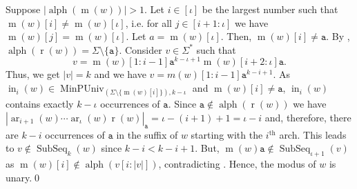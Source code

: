 \documentclass[10pt,a4paper]{amsart}
\makeatletter
\def\ta{\mathtt{a}}
\def\r{\operatorname{r}}
\def\m{\operatorname{m}}
\DeclareMathOperator{\ar}{ar}
\DeclareMathOperator{\alphabet}{alph}
\DeclareMathOperator\ScatFact{SubSeq}
\DeclareMathOperator{\MinPerfUniv}{MinPUniv}
\DeclareMathOperator{\inner}{in}
\def\nth#1{#1$^{\text{th}}$}
\theoremstyle{plain}
\theoremstyle{definition}
\renewenvironment{proof}[1][\proofname]{\par
  \pushQED{}%
  \normalfont \topsep6\p@\@plus6\p@\relax
  \trivlist
  \item[\hskip\labelsep\itshape #1\@addpunct{.}]\ignorespaces
}{%
  \popQED\endtrivlist\@endpefalse
}
\makeatother
\begin{document}
\begin{proof}
	Suppose $\vert \alphabet(\m(w))\vert  > 1$.
	Let $i\in[\iota]$ be the largest number such that $\m(w)[i] \neq \m(w)[\iota]$, i.e.
	for all $j\in[i+1:\iota]$ we have $\m(w)[j] = \m(w)[\iota]$.
	Let $a=\m(w)[\iota]$. Then, $\m(w)[i] \neq \ta$.
	By , $\alphabet(\r(w)) = \Sigma\setminus\{\ta\}$.
	Consider $v\in\Sigma^*$ such that 
	\[
	v = \m(w)[1:i-1]\ta^{k-\iota+1}\m(w)[i+2:\iota]\ta.
	\]
	Thus, we get $\vert v\vert  = k$ and we have 
	$v = m(w)[1:i-1]\ta^{k-i+1}$.
	As $\inner_i(w) \in \MinPerfUniv_{(\Sigma\setminus\{\m(w)[i]\}),k-\iota}$ and $\m(w)[i]\neq \ta$, $\inner_i(w)$ contains exactly 
	$k-\iota$ occurrences of $\ta$. 
	Since $\ta\notin\alphabet(\r(w))$ we have $|\ar_{i+1}(w)\cdots\ar_{\iota}(w)\r(w)|_{\ta}=
	\iota-(i+1)+1=\iota-i$ and, therefore, there are $k-i$ occurrences of $\ta$ in the suffix of $w$ starting with the \nth{$i$} arch. This leads to $v\not\in\ScatFact_k(w)$ since $k-i<k-i+1$.
	But, $\m(w)\ta \notin \ScatFact_{\iota+1}(v)$ as $\m(w)[i] \notin \alphabet(v[i:\vert v\vert ])$, contradicting .
	Hence, the modus of $w$ is unary.\qed
\end{proof}

\fi


\end{document}
